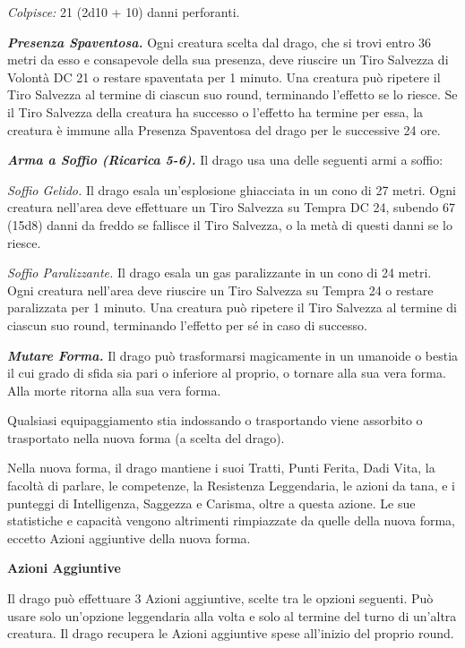 \begin{multicols}{2}
\textit{Colpisce:} 21 (2d10 + 10) danni perforanti.

\textit{\textbf{Presenza Spaventosa.}} Ogni creatura scelta dal drago, che si trovi entro 36 metri da esso e consapevole della sua presenza, deve riuscire un Tiro Salvezza di Volontà DC 21 o restare spaventata per 1 minuto. Una creatura può ripetere il Tiro Salvezza al termine di ciascun suo round, terminando l'effetto se lo riesce. Se il Tiro Salvezza della creatura ha successo o l'effetto ha termine per essa, la creatura è immune alla Presenza Spaventosa del drago per le successive 24 ore.

\textit{\textbf{Arma a Soffio (Ricarica 5-6).}} Il drago usa una delle seguenti armi a soffio:

\textit{Soffio Gelido.} Il drago esala un'esplosione ghiacciata in un cono di 27 metri. Ogni creatura nell'area deve effettuare un Tiro Salvezza su Tempra DC 24, subendo 67 (15d8) danni da freddo se fallisce il Tiro Salvezza, o la metà di questi danni se lo riesce.

\textit{Soffio Paralizzante.} Il drago esala un gas paralizzante in un cono di 24 metri. Ogni creatura nell'area deve riuscire un Tiro Salvezza su Tempra 24 o restare paralizzata per 1 minuto. Una creatura può ripetere il Tiro Salvezza al termine di ciascun suo round, terminando l'effetto per sé in caso di successo.

\textit{\textbf{Mutare Forma.}} Il drago può trasformarsi magicamente in un umanoide o bestia il cui grado di sfida sia pari o inferiore al proprio, o tornare alla sua vera forma. Alla morte ritorna alla sua vera forma.

Qualsiasi equipaggiamento stia indossando o trasportando viene assorbito o trasportato nella nuova forma (a scelta del drago).

Nella nuova forma, il drago mantiene i suoi Tratti, Punti Ferita, Dadi Vita, la facoltà di parlare, le competenze, la Resistenza Leggendaria, le azioni da tana, e i punteggi di Intelligenza, Saggezza e Carisma, oltre a questa azione. Le sue statistiche e capacità vengono altrimenti rimpiazzate da quelle della nuova forma, eccetto Azioni aggiuntive della nuova forma.

\textbf{Azioni Aggiuntive}

Il drago può effettuare 3 Azioni aggiuntive, scelte tra le opzioni seguenti. Può usare solo un'opzione leggendaria alla volta e solo al termine del turno di un'altra creatura. Il drago recupera le Azioni aggiuntive spese all'inizio del proprio round.


\end{multicols}
